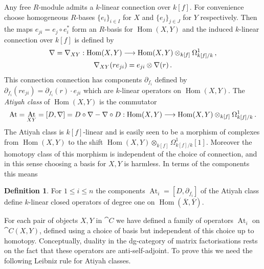 \documentclass{compositio}
\theoremstyle{definition}
\newtheorem{definition}[theorem]{Definition}
\numberwithin{equation}{section}
\def\Hom{\operatorname{Hom}}
\DeclareMathOperator{\At}{At}
\begin{document}
Any free $R$-module admits a $k$-linear connection over $k[f]$. For convenience choose homogeneous $R$-bases $\{ e_i \}_{i \in I}$ for $X$ and $\{ e_j \}_{j \in J}$ for $Y$ respectively. Then the maps $e_{ji} = e_j \circ e_i^*$ form an $R$-basis for $\Hom(X,Y)$ and the induced $k$-linear connection over $k[f]$ is defined by
\begin{gather*}
\nabla = \nabla_{XY}: \Hom(X,Y) \lto \Hom(X,Y) \otimes_{k[f]} \Omega^1_{k[f]/k}\,,\\
\nabla_{XY}( r e_{ji} ) = e_{ji} \otimes \nabla(r)\,.
\end{gather*}
This connection connection has components $\partial_{f_i}$ defined by $\partial_{f_i}( r e_{ji} ) = \partial_{f_i}(r) \cdot e_{ji}$ which are $k$-linear operators on $\Hom(X,Y)$. The \emph{Atiyah class} of $\Hom(X,Y)$ is the commutator
\[
\At = \At_{XY} = [D, \nabla] = D \circ \nabla - \nabla \circ D: \Hom(X,Y) \lto \Hom(X,Y) \otimes_{k[f]} \Omega^1_{k[f]/k}\,.
\]
The Atiyah class is $k[f]$-linear and is easily seen to be a morphism of complexes from $\Hom(X,Y)$ to the shift $\Hom(X,Y) \otimes_{k[f]} \Omega^1_{k[f]/k}[1]$. Moreover the homotopy class of this morphism is independent of the choice of connection, and in this sense choosing a basis for $X,Y$ is harmless. In terms of the components this means


\begin{definition} For $1 \le i \le n$ the components $\At_i = [D, \partial_{f_i}]$ of the Atiyah class define $k$-linear closed operators of degree one on $\Hom(\overline{X}, \overline{Y})$.
\end{definition}

For each pair of objects $X,Y$ in $\cat{C}$ we have defined a family of operators $\At_i$ on $\cat{C}(X,Y)$, defined using a choice of basis but independent of this choice up to homotopy. Conceptually, duality in the dg-category of matrix factorisations rests on the fact that these operators are anti-self-adjoint. To prove this we need the following Leibniz rule for Atiyah classes.
\end{document}
